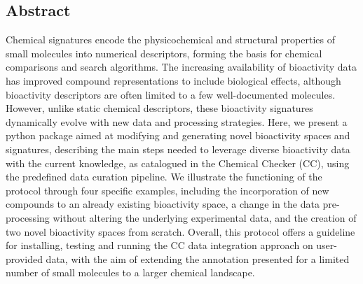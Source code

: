 \subsection{Abstract}

Chemical signatures encode the physicochemical and structural properties of small molecules into numerical descriptors, forming the basis for chemical comparisons and search algorithms. The increasing availability of bioactivity data has improved compound representations to include biological effects, although bioactivity descriptors are often limited to a few well-documented molecules. However, unlike static chemical descriptors, these bioactivity signatures dynamically evolve with new data and processing strategies. Here, we present a python package aimed at modifying and generating novel bioactivity spaces and signatures, describing the main steps needed to leverage diverse bioactivity data with the current knowledge, as catalogued in the Chemical Checker (CC), using the predefined data curation pipeline. We illustrate the functioning of the protocol through four specific examples, including the incorporation of new compounds to an already existing bioactivity space, a change in the data pre-processing without altering the underlying experimental data, and the creation of two novel bioactivity spaces from scratch. Overall, this protocol offers a guideline for installing, testing and running the CC data integration approach on user-provided data, with the aim of extending the annotation presented for a limited number of small molecules to a larger chemical landscape.
